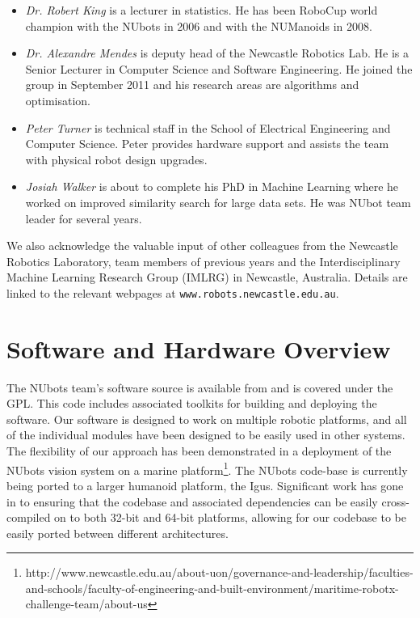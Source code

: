 \documentclass{llncs}
\begin{document}
\begin{itemize}
\item \emph{Dr. Robert King} is a lecturer in statistics. He has been RoboCup world champion with the NUbots in 2006 and with the NUManoids in 2008. 

\item \emph{Dr. Alexandre Mendes} is deputy head of the Newcastle Robotics Lab. He is a Senior Lecturer in Computer Science and Software Engineering. He joined the group in September 2011 and his research areas are algorithms and optimisation.

\item \emph{Peter Turner} is technical staff in the School of Electrical Engineering and Computer Science. Peter provides hardware support and assists the team with physical robot design upgrades. %

\item \emph{Josiah Walker} is about to complete his PhD in Machine Learning where he worked on improved similarity search for large data sets. He was NUbot team leader for several years.




\end{itemize}
We also acknowledge the valuable input of other colleagues from the Newcastle Robotics Laboratory, team members of previous years
and the Interdisciplinary Machine Learning Research Group (IMLRG) in
Newcastle, Australia. Details are linked to the relevant webpages at
\texttt{www.robots.newcastle.edu.au}.

\section{Software and Hardware Overview}
The NUbots team's software source is available from \cite{nubotsGit} and is covered under the GPL. This code includes associated toolkits for building and deploying the software. Our software is designed to work on multiple robotic platforms, and all of the individual modules have been designed to be easily used in other systems. The flexibility of our approach has been demonstrated in a deployment of the NUbots vision system on a marine platform\footnote{http://www.newcastle.edu.au/about-uon/governance-and-leadership/faculties-and-schools/faculty-of-engineering-and-built-environment/maritime-robotx-challenge-team/about-us}. The NUbots code-base is currently being ported to a larger humanoid platform, the Igus. Significant work has gone in to ensuring that the codebase and associated dependencies can be easily cross-compiled on to both 32-bit and 64-bit platforms, allowing for our codebase to be easily ported between different architectures.%
\end{document}
